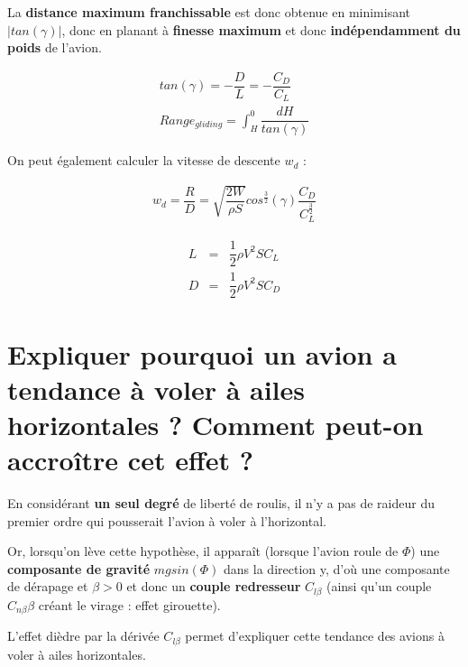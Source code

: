 \documentclass{report}
\begin{document}
La \textbf{distance maximum franchissable} est donc obtenue en minimisant $|tan(\gamma)|$, donc en planant à \textbf{finesse maximum} et donc \textbf{indépendamment du poids} de l'avion.

\begin{eqnarray}
tan(\gamma) = -\dfrac{D}{L}=-\dfrac{C_D}{C_L}\\
Range_{gliding}=\int_H^0\dfrac{dH}{tan(\gamma)}
\end{eqnarray}

On peut également calculer la vitesse de descente $w_d$ :

\begin{eqnarray}
w_d=\dfrac{R}{D}=\sqrt{\dfrac{2W}{\rho S}}cos^{\frac{3}{2}}(\gamma)\dfrac{C_D}{C_L^{\frac{3}{2}}}
\end{eqnarray}

\begin{eqnarray}
L &= &\dfrac{1}{2}\rho V^2 S C_L\\
D &= &\dfrac{1}{2}\rho V^2 S C_D
\end{eqnarray}


\section{Expliquer pourquoi un avion a tendance à voler à ailes horizontales ? Comment peut-on accroître cet effet ?}

En considérant \textbf{un seul degré} de liberté de roulis, il n'y a pas de raideur du premier ordre qui pousserait l'avion à voler à l'horizontal.

Or, lorsqu'on lève cette hypothèse, il apparaît (lorsque l'avion roule de $\Phi$) une \textbf{composante de gravité} $mgsin(\Phi)$ dans la direction y, d'où une composante de dérapage et $\beta>0$ et donc un \textbf{couple redresseur} $C_{l\beta}$ (ainsi qu'un couple $C_{n\beta}\beta$ créant le virage : effet girouette).

L'effet dièdre par la dérivée $C_{l\beta}$ permet d'expliquer cette tendance des avions à voler à ailes horizontales.
\end{document}
